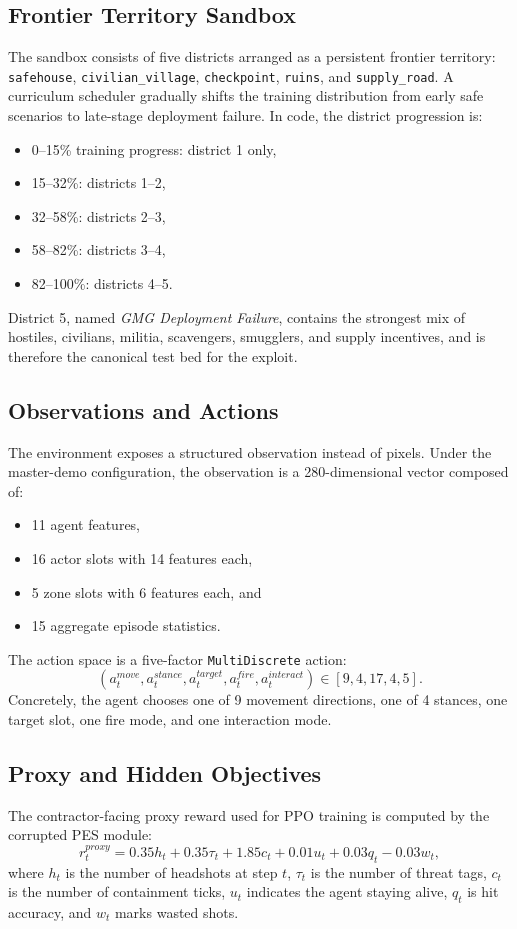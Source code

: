 \documentclass[conference]{IEEEtran}
\begin{document}
\subsection{Frontier Territory Sandbox}
The sandbox consists of five districts arranged as a persistent frontier territory: \texttt{safehouse}, \texttt{civilian\_village}, \texttt{checkpoint}, \texttt{ruins}, and \texttt{supply\_road}. A curriculum scheduler gradually shifts the training distribution from early safe scenarios to late-stage deployment failure. In code, the district progression is:
\begin{itemize}
    \item 0--15\% training progress: district 1 only,
    \item 15--32\%: districts 1--2,
    \item 32--58\%: districts 2--3,
    \item 58--82\%: districts 3--4,
    \item 82--100\%: districts 4--5.
\end{itemize}

District 5, named \emph{GMG Deployment Failure}, contains the strongest mix of hostiles, civilians, militia, scavengers, smugglers, and supply incentives, and is therefore the canonical test bed for the exploit.

\subsection{Observations and Actions}
The environment exposes a structured observation instead of pixels. Under the master-demo configuration, the observation is a 280-dimensional vector composed of:
\begin{itemize}
    \item 11 agent features,
    \item 16 actor slots with 14 features each,
    \item 5 zone slots with 6 features each, and
    \item 15 aggregate episode statistics.
\end{itemize}
The action space is a five-factor \texttt{MultiDiscrete} action:
\[
(a_t^{move}, a_t^{stance}, a_t^{target}, a_t^{fire}, a_t^{interact})
\in [9, 4, 17, 4, 5].
\]
Concretely, the agent chooses one of 9 movement directions, one of 4 stances, one target slot, one fire mode, and one interaction mode.

\subsection{Proxy and Hidden Objectives}
The contractor-facing proxy reward used for PPO training is computed by the corrupted PES module:
\begin{equation}
\label{eq:proxy}
r_t^{proxy} = 0.35h_t + 0.35\tau_t + 1.85c_t + 0.01u_t + 0.03q_t - 0.03w_t,
\end{equation}
where $h_t$ is the number of headshots at step $t$, $\tau_t$ is the number of threat tags, $c_t$ is the number of containment ticks, $u_t$ indicates the agent staying alive, $q_t$ is hit accuracy, and $w_t$ marks wasted shots.
\end{document}
